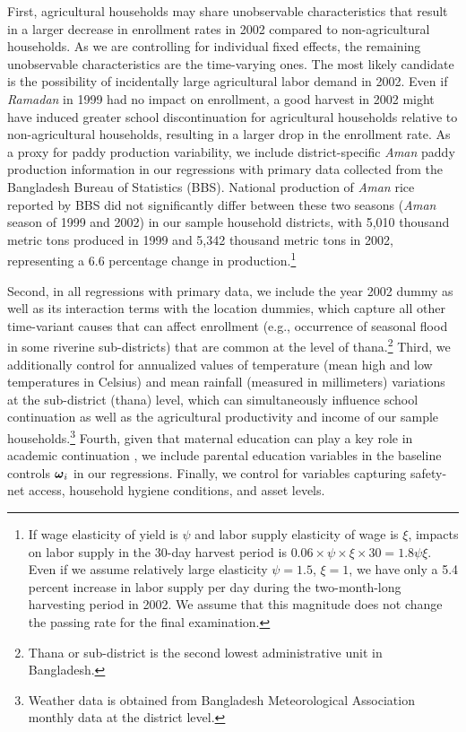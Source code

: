 \documentclass[12pt,letterpaper]{article}
\newcommand{\bfomega}{\ensuremath{\mbox{\boldmath $\omega$}}}
\newcommand{\0}{\ensuremath{\mbox{\boldmath $0$}}}
\begin{document}
First, agricultural households may share unobservable characteristics that result in a larger decrease in enrollment rates in 2002 compared to non-agricultural households. As we are controlling for individual fixed effects, the remaining unobservable characteristics are the time-varying ones. The most likely candidate is the possibility of incidentally large agricultural labor demand in 2002. Even if \textit{Ramadan} in 1999 had no impact on enrollment, a good harvest in 2002 might have induced greater school discontinuation for agricultural households relative to non-agricultural households, resulting in a larger drop in the enrollment rate. As a proxy for paddy production variability, we include district-specific \textit{Aman} paddy production information in our regressions with primary data collected from the Bangladesh Bureau of Statistics (BBS). National production of \textit{Aman} rice reported by BBS did not significantly differ between these two seasons (\textit{Aman} season of 1999 and 2002) in our sample household districts, with 5,010 thousand metric tons produced in 1999 and 5,342 thousand metric tons in 2002, representing a 6.6 percentage change in production.\footnote{If wage elasticity of yield is $\psi$ and labor supply elasticity of wage is $\xi$, impacts on labor supply in the 30-day harvest period is $0.06\times\psi\times\xi\times 30 = 1.8\psi\xi$. Even if we assume relatively large elasticity $\psi = 1.5$, $\xi=1$, we have only a 5.4 percent increase in labor supply per day during the two-month-long harvesting period in 2002. We assume that this magnitude does not change the passing rate for the final examination. } 

Second, in all regressions with primary data, we include the year 2002 dummy as well as its interaction terms with the location dummies, which capture all other time-variant causes that can affect enrollment (e.g., occurrence of seasonal flood in some riverine sub-districts) that are common at the level of thana.\footnote{Thana or sub-district is the second lowest administrative unit in Bangladesh.} Third, we additionally control for annualized values of temperature (mean high and low temperatures in Celsius) and mean rainfall (measured in millimeters) variations at the sub-district (thana) level, which can simultaneously influence school continuation as well as the agricultural productivity and income of our sample households.\footnote{Weather data is obtained from Bangladesh Meteorological Association monthly data at the district level.} Fourth, given that maternal education can play a key role in academic continuation \citep{BFRV1999}, we include parental education variables in the baseline controls $\bfomega_{i}$ in our regressions. Finally, we control for variables capturing safety-net access, household hygiene conditions, and asset levels.
\end{document}

